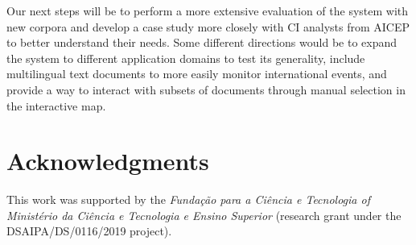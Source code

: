 \documentclass[a4paper]{article}
\begin{document}
Our next steps will be to perform a more extensive evaluation of the system with new corpora and develop a case study more closely with CI analysts from AICEP to better understand their needs. Some different directions would be to expand the system to different application domains to test its generality, include multilingual text documents to more easily monitor international events, and provide a way to interact with subsets of documents through manual selection in the interactive map. 

\section*{Acknowledgments}
This work was supported by the \emph{Fundação para a Ciência e Tecnologia of Ministério da Ciência e Tecnologia e Ensino Superior} (research grant under the DSAIPA/DS/0116/2019 project).




\appendix
\end{document}
